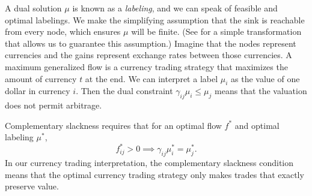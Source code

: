 \documentclass[11pt]{article}
\theoremstyle{definition}
\theoremstyle{definition}
\theoremstyle{definition}
\begin{document}
	A dual solution $\mu$ is known as a \emph{labeling}, and we can speak of feasible and 
	optimal labelings.
    We make the simplifying assumption that the sink is
	reachable from every node, which ensures $\mu$ will be finite. (See \cite{Olver2017} for
    a simple transformation that allows us to guarantee this assumption.)
    Imagine that
	the nodes represent currencies and the gains represent exchange rates between those currencies.
	A maximum generalized flow is a currency trading strategy that maximizes the amount of currency
	$t$ at the end. We can interpret a label $\mu_i$ as the value of one dollar in currency $i$.
	Then the dual constraint
    $\gamma_{ij} \mu_i \leq \mu_j$ means that the valuation does not permit arbitrage.
    
	Complementary slackness requires that for an optimal flow $f^*$ and optimal labeling $\mu^*$,
    \begin{equation}\label{eqn.cs} \tag{CS}
    f^*_{ij} > 0 \implies \gamma_{ij}\mu^*_i = \mu^*_j.
    \end{equation}
	In our currency trading interpretation,
	the complementary slackness condition means that the optimal currency trading strategy
	only makes trades that exactly preserve value.
	
\end{document}
